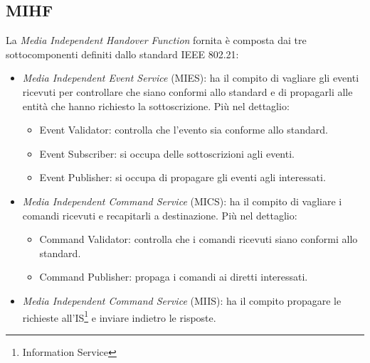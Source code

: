 \subsection{MIHF}
La {\em Media Independent Handover Function} fornita è composta dai tre sottocomponenti definiti dallo standard IEEE 802.21:
\begin{itemize}
\item {\em Media Independent Event Service} (MIES): ha il compito di vagliare gli eventi ricevuti per controllare che siano conformi allo standard e di propagarli alle entità che hanno richiesto la sottoscrizione. Più nel dettaglio:
\begin{itemize}
\item Event Validator: controlla che l'evento sia conforme allo standard.

\item Event Subscriber: si occupa delle sottoscrizioni agli eventi.

\item Event Publisher: si occupa di propagare gli eventi agli interessati.
\end{itemize}

\item {\em Media Independent Command Service} (MICS): ha il compito di vagliare i comandi ricevuti e recapitarli a destinazione. Più nel dettaglio:
\begin{itemize}
\item Command Validator: controlla che i comandi ricevuti siano conformi allo standard.

\item Command Publisher: propaga i comandi ai diretti interessati.
\end{itemize}

\item {\em Media Independent Command Service} (MIIS): ha il compito propagare le richieste all'IS\footnote{Information Service} e inviare indietro le risposte.
\end{itemize}

